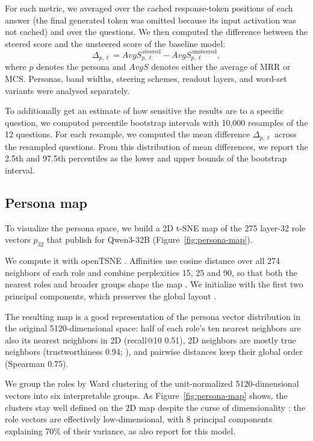 For each metric, we averaged over the cached response-token positions of each answer (the final generated token was omitted because its input activation was not cached) and over the questions.
We then computed the difference between the steered score and the unsteered score of the baseline model:
\[
\Delta_{p,\ell}
=AvgS^{\,\mathrm{steered}}_{p,\ell}
-AvgS^{\,\mathrm{unsteered}}_{p,\ell},
\]
where $p$ denotes the persona and $AvgS$ denotes either the average of MRR or MCS.
Personas, band widths, steering schemes, readout layers, and word-set variants were analysed separately.

To additionally get an estimate of how sensitive the results are to a specific question, we computed percentile bootstrap intervals with 10,000 resamples of the 12 questions. For each resample, we computed the mean difference $\Delta_{p,\ell}$ across the resampled questions. From this distribution of mean differences, we report the 2.5th and 97.5th percentiles as the lower and upper bounds of the bootstrap interval.


\subsection{Persona map}
\label{sec:persona-map}
To visualize the persona space, we build a 2D t-SNE map \citep{vandermaatenVisualizingDataUsing2008} of the 275 layer-32 role vectors $p_{32}$
that \citet{lu2026assistant} publish for Qwen3-32B (Figure~\ref{fig:persona-map}).

We compute it with openTSNE \citep{policarOpenTSNEModularPython2024}.
Affinities use cosine distance over all 274 neighbors of each role and combine perplexities 15, 25 and 90,
so that both the nearest roles and broader groups shape the map \citep{leeMultiscaleSimilaritiesStochastic2015}.
We initialize with the first two principal components, which preserves the global layout \citep{kobakInitializationCriticalPreserving2021}.

The resulting map is a good representation of the persona vector distribution in the original 5120-dimensional space:
half of each role's ten nearest neighbors are also its nearest neighbors in 2D (recall@10 0.51),
2D neighbors are mostly true neighbors (trustworthiness 0.94; \citealp{vennaNeighborhoodPreservationNonlinear2001}),
and pairwise distances keep their global order (Spearman 0.75).

We group the roles by Ward clustering \citep{wardjr.HierarchicalGroupingOptimize1963} of the unit-normalized 5120-dimensional vectors
into six interpretable groups. As Figure~\ref{fig:persona-map} shows, the clusters stay well defined on the 2D map despite the curse of dimensionality \citep{beyerWhenNearestNeighbor1999}:
the role vectors are effectively low-dimensional, with 8 principal components explaining 70\% of their variance,
as \citet{lu2026assistant} also report for this model.

